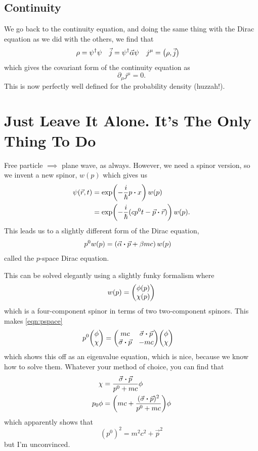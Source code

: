 \documentclass[]{revision-notes}
\begin{document}
\subsection{Continuity}
We go back to the continuity equation, and doing the same thing with the Dirac equation as we did with the others, we find that
\begin{align*}
  \rho &= \psi^\dagger \psi & \vec{j} &= \psi^\dagger \vec{\alpha} \psi & j^\mu &= \mqty(\rho, \vec{j})
\end{align*}
which gives the covariant form of the continuity equation as \[\partial_\mu j^\mu = 0. \]
This is now perfectly well defined for the probability density (huzzah!).

\section{Just Leave It Alone. It's The Only Thing To Do}
Free particle \(\implies \) plane wave, as always.
However, we need a spinor version, so we invent a new spinor, \(w(p)\) which gives us
\begin{align*}
  \psi(\vec{r}, t) &= \exp(-\frac{i}{\hbar}p\vdot x)\,w(p)\\
  &= \exp(-\frac{i}{\hbar}(cp^0 t - \vec{p}\vdot\vec{r}))\,w(p).
\end{align*}
This leads us to a slightly different form of the Dirac equation,
\begin{align}
  p^0 w (p) &= (\vec{\alpha} \vdot \vec{p} + \beta m c)\, w(p)\label{eqn:pspace}
\end{align}
 called the \(p\)-space Dirac equation.

 This can be solved elegantly using a slightly funky formalism where
 \[ w(p) = \mqty(\phi(p)\\\chi(p))\] which is a four-component spinor in terms of two two-component spinors.
 This makes \autoref{eqn:pspace}
 \begin{align*}
   p^0 \mqty(\phi\\\chi) &= \mqty(mc & \vec{\sigma}\vdot \vec{p} \\ \vec{\sigma}\vdot \vec{p} & -mc ) \mqty(\phi\\\chi)
 \end{align*}
 which shows this off as an eigenvalue equation, which is nice, because we know how to solve them.
 Whatever your method of choice, you can find that
 \begin{align*}
   \chi &= \frac{\vec{\sigma}\vdot\vec{p}}{p^0 + mc}\phi\\
   p_0 \phi &= \qty(mc + \frac{(\vec{\sigma}\vdot \vec{p})^2}{p^0 + mc})\phi
 \end{align*}
which apparently shows that
\[(p^0)^2 = m^2c^2 + \vec{p}^2\]
but I'm unconvinced.
\end{document}
